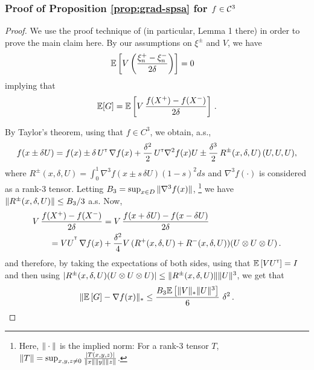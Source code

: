 \subsubsection*{Proof of Proposition \ref{prop:grad-spsa} for $f \in \mathcal{C}^3$}
\begin{proof}
We use the proof technique of \cite{spall1992multivariate} (in particular, Lemma 1 there) in order to prove the main claim here.
By our assumptions on $\xi^{\pm}$ and $V$,  we have
\begin{align*}
&\mathbb{E}\left[  V\left(\dfrac{\xi_n^+ - \xi_n^-}{2\delta}\right) \right]= 0 
\end{align*}
implying that
\begin{align*}
\mathbb{E}[G] =  \mathbb{E}\left[V\,  \dfrac{f(X^+)  -f(X^-)}{2\delta} \right]\,.
\end{align*}

By Taylor's theorem, using that $f\in C^3$, we obtain, a.s., 
\begin{align*}
f(x \pm \delta U) =
 f(x) 
 \pm\delta\,  U^\mathsf{\scriptscriptstyle T}\,\nabla f(x)   
  + \frac{\delta^2}{2}\, U^\mathsf{\scriptscriptstyle T} \nabla^2 f(x) U 
  \pm  \frac{\delta^3}{2} \, R^{\pm}(x,\delta,U) \,(U, U, U),
\end{align*}
where
$R^{\pm}(x,\delta,U)= \int_0^1  \nabla^3 f(  x \pm s \, \delta U ) (1-s)^2 ds $ and $\nabla^3 f(\cdot)$ is considered as a rank-3 tensor.
Letting $B_3 = \sup_{x\in D} \| \nabla^3 f(x) \|$,%
\footnote{Here, $\|\cdot\|$ is the implied norm: For a rank-3 tensor $T$, $\|T\| = \sup_{x,y,z\ne 0}
\frac{|T (x,y,z)|}{\|x\|\|y\|\|z\|}$.
}
we have $\| R^{\pm}(x,\delta,U)\| \le B_3/3$ a.s.
Now,
\begin{align}
\begin{split}
\MoveEqLeft       V\, \dfrac{f(X^+)-f(X^-)}{2\delta}
  = V\, \dfrac{f(x+\delta U) - f(x-\delta U)}{2\delta} \\
&= VU^{\tr}
\, \nabla f(x)   +   \frac{\delta^2}{4}  V \,(R^{+}(x,\delta,U)+R^{-}(x,\delta,U))(U \otimes U \otimes U)\,. 
\end{split}
\label{eq:l1}
\end{align}
and therefore, 
by taking the expectations of both sides, 
using that $\mathbb{E}\left[V U^\mathsf{\scriptscriptstyle T}\right] = I$ and then using $|R^{\pm}(x,\delta,U) (U \otimes U \otimes U)| \le 
\|R^{\pm}(x,\delta,U)\| \|U\|^3$, 
we get that
\begin{align*}
\| \mathbb{E}\left[ G \right] - \nabla f(x) \|_* 
\le \frac{B_3 \mathbb{E}\left[ \|V\|_* \|U\|^3 \right]}{6}\,\, \delta^2 \,.
\end{align*}


\end{proof}
